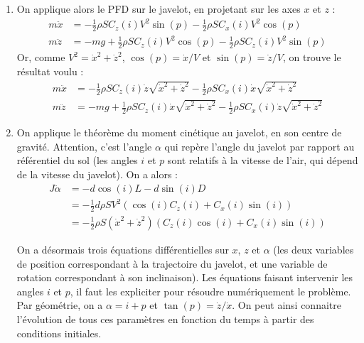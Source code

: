 \begin{correction}
\begin{enumerate}
	\item On applique alors le PFD sur le javelot, en projetant sur les axes $x$ et $z$ :
	\begin{align*}
		m\ddot{x} &= -\frac{1}{2}\rho SC_z(i)V^2\sin(p)-\frac{1}{2}\rho SC_x(i)V^2\cos(p) \\
		m\ddot{z} &= -mg+\frac{1}{2}\rho SC_z(i)V^2\cos(p)-\frac{1}{2}\rho SC_z(i)V^2\sin(p)
	\end{align*}
	Or, comme $V^2=\dot{x}^2+\dot{z}^2$, $\cos(p)=\dot{x}/V$ et $\sin(p)=\dot{z}/V$, on trouve le résultat voulu : 
	\begin{align*}
		m\ddot{x} &= -\frac{1}{2}\rho SC_z(i)\dot{z}\sqrt{\dot{x}^2+\dot{z}^2}-\frac{1}{2}\rho SC_x(i)\dot{x}\sqrt{\dot{x}^2+\dot{z}^2} \\
		m\ddot{z} &= -mg+\frac{1}{2}\rho SC_z(i)\dot{x}\sqrt{\dot{x}^2+\dot{z}^2}-\frac{1}{2}\rho SC_x(i)\dot{z}\sqrt{\dot{x}^2+\dot{z}^2}
	\end{align*}
	
	\item On applique le théorème du moment cinétique au javelot, en son centre de gravité. Attention, c'est l'angle $\alpha$ qui repère l'angle du javelot par rapport au référentiel du sol (les angles $i$ et $p$ sont relatifs à la vitesse de l'air, qui dépend de la vitesse du javelot). On a alors :
	\begin{align*}
		J\ddot{\alpha} &= -d\cos(i)L-d\sin(i)D \\
		&=-\frac{1}{2}d\rho SV^2(\cos(i)C_z(i)+C_x(i)\sin(i)) \\
		&=-\frac{1}{2}\rho S(\dot{x}^2+\dot{z}^2)(C_z(i)\cos(i)+C_x(i)\sin(i))
	\end{align*}
	
	On a désormais trois équations différentielles sur $x$, $z$ et $\alpha$  (les deux variables de position correspondant à la trajectoire du javelot, et une variable de rotation correspondant à son inclinaison). Les équations faisant intervenir les angles $i$ et $p$, il faut les expliciter pour résoudre numériquement le problème. Par géométrie, on a $\alpha=i+p$ et $\tan(p)=\dot{z}/\dot{x}$. On peut ainsi connaitre l'évolution de tous ces paramètres en fonction du temps à partir des conditions initiales.

\end{enumerate}

\end{correction}
